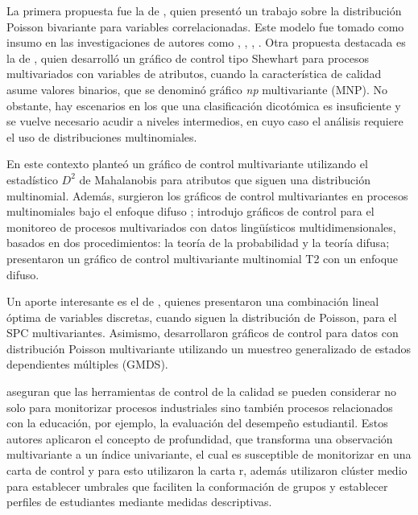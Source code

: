 \documentclass[mathematics,article,submit,moreauthors,pdftex]{mdpi}
\begin{document}
La primera propuesta fue la de \citet{holgate1964}, quien presentó un
trabajo sobre la distribución Poisson bivariante para variables
correlacionadas. Este modelo fue tomado como insumo en las
investigaciones de autores como \citet{chiu2007}, \citet{ho2009},
\citet{laungrungrong2011ewma}, \citet{epprecht2013optimal}. Otra
propuesta destacada es la de \citet{lu1998control}, quien desarrolló un
gráfico de control tipo Shewhart para procesos multivariados con
variables de atributos, cuando la característica de calidad asume
valores binarios, que se denominó gráfico \emph{np} multivariante (MNP).
No obstante, hay escenarios en los que una clasificación dicotómica es
insuficiente y se vuelve necesario acudir a niveles intermedios, en cuyo
caso el análisis requiere el uso de distribuciones multinomiales.

En este contexto \citet{ranjan2008multivariate} planteó un gráfico de
control multivariante utilizando el estadístico \(D^2\) de Mahalanobis
para atributos que siguen una distribución multinomial. Además,
surgieron los gráficos de control multivariantes en procesos
multinomiales bajo el enfoque difuso \citep{taleb2006multivariate};
\citet{taleb2009control} introdujo gráficos de control para el monitoreo
de procesos multivariados con datos lingüísticos multidimensionales,
basados en dos procedimientos: la teoría de la probabilidad y la teoría
difusa; \citet{pastuizaca2015multivariate} presentaron un gráfico de
control multivariante multinomial T2 con un enfoque difuso.

Un aporte interesante es el de \citet{epprecht2013optimal}, quienes
presentaron una combinación lineal óptima de variables discretas, cuando
siguen la distribución de Poisson, para el SPC multivariantes. Asimismo,
\citet{raza2019design} desarrollaron gráficos de control para datos con
distribución Poisson multivariante utilizando un muestreo generalizado
de estados dependientes múltiples (GMDS).

\citet{Saltos2020} aseguran que las herramientas de control de la
calidad se pueden considerar no solo para monitorizar procesos
industriales sino también procesos relacionados con la educación, por
ejemplo, la evaluación del desempeño estudiantil. Estos autores
aplicaron el concepto de profundidad, que transforma una observación
multivariante a un índice univariante, el cual es susceptible de
monitorizar en una carta de control y para esto utilizaron la carta r,
además utilizaron clúster medio para establecer umbrales que faciliten
la conformación de grupos y establecer perfiles de estudiantes mediante
medidas descriptivas.
\end{document}
